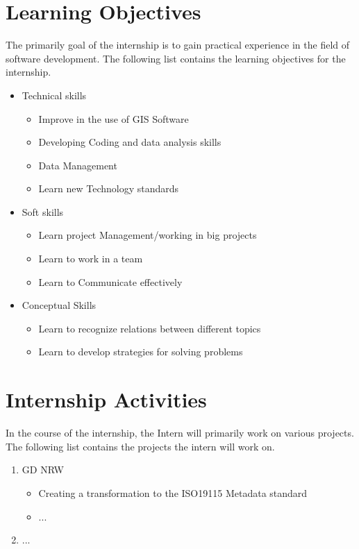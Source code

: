 \documentclass{article}
\begin{document}
\section{Learning Objectives}
The primarily goal of the internship is to gain practical experience in the field of software development. The following list contains the learning objectives for the internship. 
\begin{itemize}
\item Technical skills
\begin{itemize}
    \item Improve in the use of GIS Software
    \item Developing Coding and data analysis skills
    \item Data Management
    \item Learn new Technology standards
\end{itemize}
\item Soft skills
\begin{itemize}
    \item Learn project Management/working in big projects
    \item Learn to work in a team
    \item Learn to Communicate effectively
\end{itemize}
\item Conceptual Skills
\begin{itemize}
    \item Learn to recognize relations between different topics
    \item Learn to develop strategies for solving problems
\end{itemize}
\end{itemize}

\section{Internship Activities}
In the course of the internship, the Intern will primarily work on various projects. The following list contains the projects the intern will work on.

\begin{enumerate}
    \item GD NRW
    \begin{itemize}
        \item Creating a transformation to the ISO19115 Metadata standard
        \item ...
    \end{itemize}
    \item ... 
    \end{enumerate}
\end{document}
